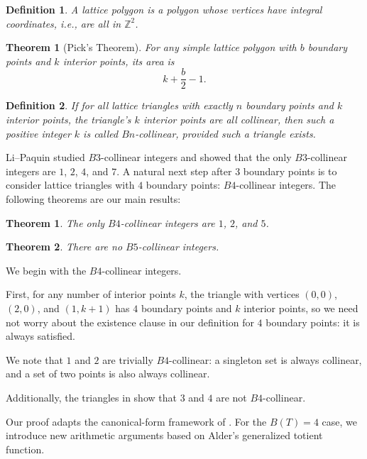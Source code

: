 \documentclass{article}
\theoremstyle{mydefstyle}
\newtheorem{theorem}{Theorem}
\newtheorem*{definition}{Definition}
\newtheorem*{theorem*}{Theorem}
\newcommand{\zz}[0]{\mathbb Z}
\begin{document}
\begin{definition}
A \textit{lattice polygon} is a polygon whose vertices have integral coordinates, i.e., are all in $\zz^2$. 
\end{definition}

\begin{theorem*}[Pick's Theorem]\cite{pick1899geometrisches}
For any simple lattice polygon with $b$ boundary points and $k$ interior points, its area is \[k+\frac b2-1.\] 
\end{theorem*}

\begin{definition}
If for all lattice triangles with exactly $n$ boundary points and $k$ interior points, the triangle's $k$ interior points are all collinear, then such a positive integer $k$ is called \textit{$Bn$-collinear}, provided such a triangle exists. 
\end{definition}

Li--Paquin\cite{li2025lattice} studied $B3$-collinear integers and showed that the only $B3$-collinear integers are $1$, $2$, $4$, and $7$. A natural next step after $3$ boundary points is to consider lattice triangles with $4$ boundary points: $B4$-collinear integers. The following theorems are our main results: 

\begin{theorem}
\label{main:label}
The only $B4$-collinear integers are $1$, $2$, and $5$. 
\end{theorem}

\begin{theorem}
\label{main5:label}
There are no $B5$-collinear integers. 
\end{theorem}

We begin with the $B4$-collinear integers. 

First, for any number of interior points $k$, the triangle with vertices $(0,0)$, $(2,0)$, and $(1,k+1)$ has $4$ boundary points and $k$ interior points, so we need not worry about the existence clause in our definition for $4$ boundary points: it is always satisfied. 

We note that $1$ and $2$ are trivially $B4$-collinear: a singleton set is always collinear, and a set of two points is also always collinear. 

Additionally, the triangles in  show that $3$ and $4$ are not $B4$-collinear. 

Our proof adapts the canonical-form framework of \cite{li2025lattice}. For the $B(T)=4$ case, we introduce new arithmetic arguments based on Alder's generalized totient function. 
\end{document}
